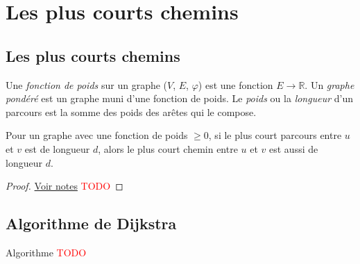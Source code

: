 \section{Les plus courts chemins}
\subsection{Les plus courts chemins}
\begin{mydef}
  Une \emph{fonction de poids} sur un graphe ($V$, $E$, $\varphi$) est une fonction $E \to \mathbb{R}$. Un \emph{graphe pondéré} est un graphe muni d’une fonction de poids. Le \emph{poids} ou la \emph{longueur} d’un parcours est la somme des poids des arêtes qui le compose.
\end{mydef}

\begin{mytheo} 
  Pour un graphe avec une fonction de poids $\geq 0$, si le plus court parcours entre $u$ et $v$ est de longueur $d$, alors le plus court chemin entre $u$ et $v$ est aussi de longueur $d$.
  \begin{proof}
     \href{https://dl.dropboxusercontent.com/u/44092863/Graph_Theory_Romain_Capron.pdf}{Voir notes} \textcolor{red}{TODO}
  \end{proof}
\end{mytheo}

\subsection{Algorithme de Dijkstra}
\begin{myalgo}
  Algorithme \textcolor{red}{TODO}
\end{myalgo}

